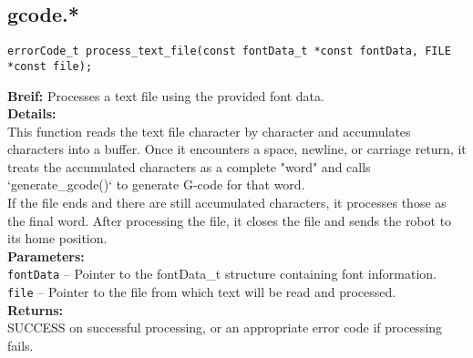 \subsection{gcode.*}


\begin{verbatim}
errorCode_t process_text_file(const fontData_t *const fontData, FILE *const file);
\end{verbatim}
\textbf{Breif:} Processes a text file using the provided font data. \\
\textbf{Details:} \\
\hspace*{1cm}This function reads the text file character by character and accumulates characters into a buffer. Once it encounters a space, newline, or carriage return, it treats the accumulated characters as a complete "word" and calls `generate\_gcode()` to generate G-code for that word. \\
\hspace*{1cm}If the file ends and there are still accumulated characters, it processes those as the final word. After processing the file, it closes the file and sends the robot to its home position. \\
\textbf{Parameters:} \\
\hspace*{1cm}\texttt{fontData} -- Pointer to the fontData\_t structure containing font information. \\
\hspace*{1cm}\texttt{file} -- Pointer to the file from which text will be read and processed. \\
\textbf{Returns:} \\
\hspace*{1cm}SUCCESS on successful processing, or an appropriate error code if processing fails. \\[1em]

